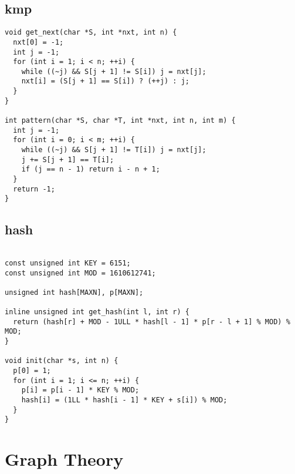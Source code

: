 \documentclass[twoside]{article}
\begin{document}
\subsection{kmp}
\begin{lstlisting}
void get_next(char *S, int *nxt, int n) {
  nxt[0] = -1;
  int j = -1;
  for (int i = 1; i < n; ++i) {
    while ((~j) && S[j + 1] != S[i]) j = nxt[j];
    nxt[i] = (S[j + 1] == S[i]) ? (++j) : j;
  }
}

int pattern(char *S, char *T, int *nxt, int n, int m) {
  int j = -1;
  for (int i = 0; i < m; ++i) {
    while ((~j) && S[j + 1] != T[i]) j = nxt[j];
    j += S[j + 1] == T[i];
    if (j == n - 1) return i - n + 1;
  }
  return -1;
}

\end{lstlisting}
\subsection{hash}
\begin{lstlisting}

const unsigned int KEY = 6151;
const unsigned int MOD = 1610612741;

unsigned int hash[MAXN], p[MAXN];

inline unsigned int get_hash(int l, int r) {
  return (hash[r] + MOD - 1ULL * hash[l - 1] * p[r - l + 1] % MOD) % MOD;
}

void init(char *s, int n) {
  p[0] = 1;
  for (int i = 1; i <= n; ++i) {
    p[i] = p[i - 1] * KEY % MOD;
    hash[i] = (1LL * hash[i - 1] * KEY + s[i]) % MOD;
  }
}

\end{lstlisting}

\section{Graph Theory}
\end{document}

